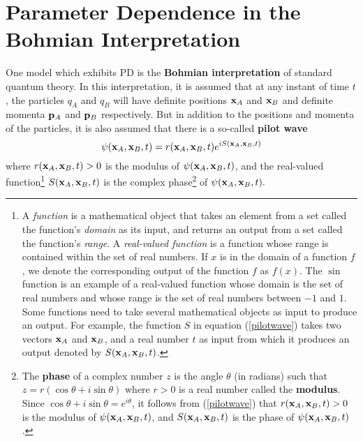 
\section{Parameter Dependence in the Bohmian Interpretation}\label{PI}
One model which exhibits PD is the \textbf{Bohmian interpretation} of standard quantum theory. In this interpretation, it is assumed that at any instant of time $t$, the particles $q_A$ and $q_B$ will have definite positions $\vb{x}_A$ and $\vb{x}_B$ %
%
and definite momenta $\vb{p}_A$ and $\vb{p}_B$ %
%
respectively. But in addition to the positions and momenta of the particles, it is also assumed that there is a so-called \textbf{pilot wave} 
\begin{equation}\label{pilotwave}
\psi(\vb{x}_A, \vb{x}_B, t)=r(\vb{x}_A, \vb{x}_B, t)e^{i S(\vb{x}_A, \vb{x}_B, t)} 
\end{equation}where $r(\vb{x}_A, \vb{x}_B, t)>0$ %
% 
is the modulus of $\psi(\vb{x}_A, \vb{x}_B, t)$, %
%
and the real-valued function\footnote{A \emph{function} is a mathematical object that takes an element from a set called the function's \emph{domain} as its input, and returns an output from a set called the function's \emph{range}. A \emph{real-valued function} is a function whose range is contained within the set of real numbers. If $x$ is in the domain of a function $f$, we denote the corresponding output of the function $f$ as $f(x)$. The $\sin$ function is an example of a real-valued function whose domain is the set of real numbers and whose range is the set of real numbers between $-1$ and $1$. Some functions need to  take several mathematical objects as input to produce an output. For example, the function $S$ in equation (\ref{pilotwave}) takes two vectors $\vb{x}_A$ and $\vb{x}_B$, and a real number $t$ as input from which it produces an output denoted by $S(\vb{x}_A, \vb{x}_B, t)$.} $S(\vb{x}_A, \vb{x}_B,t )$ is %
%
the complex phase\footnote{The \textbf{phase} of a complex number $z$ is the angle $\theta$ (in radians) such that $z=r(\cos \theta + i \sin \theta)$ where $r>0$ is a real number called the \textbf{modulus}. Since $\cos \theta + i\sin \theta=e^{i \theta}$, %
%
it follows from (\ref{pilotwave}) that $r(\vb{x}_A, \vb{x}_B, t)>0$ is the modulus of $\psi(\vb{x}_A, \vb{x}_B, t)$, and $S(\vb{x}_A, \vb{x}_B,t )$ is the phase of $\psi(\vb{x}_A, \vb{x}_B, t)$.} of $\psi(\vb{x}_A, \vb{x}_B, t).$

